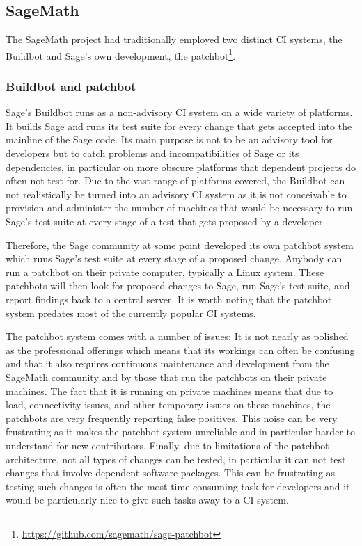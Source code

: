\documentclass{deliverablereport}
\begin{document}
\subsection{SageMath}

The SageMath project had traditionally employed two distinct CI systems, the
Buildbot and Sage's own development, the
patchbot\footnote{\url{https://github.com/sagemath/sage-patchbot}}.

\subsubsection{Buildbot and patchbot}
Sage's Buildbot runs as a non-advisory CI system on a wide variety of
platforms. It builds Sage and runs its test suite for every change that gets
accepted into the mainline of the Sage code. Its main purpose is not to be an
advisory tool for developers but to catch problems and incompatibilities of
Sage or its dependencies, in particular on more obscure platforms that
dependent projects do often not test for. Due to the vast range of platforms
covered, the Buildbot can not realistically be turned into an advisory CI
system as it is not conceivable to provision and administer the number of
machines that would be necessary to run Sage's test suite at every stage of a
test that gets proposed by a developer.

Therefore, the Sage community at some point developed its own patchbot system
which runs Sage's test suite at every stage of a proposed change. Anybody can
run a patchbot on their private computer, typically a Linux system. These
patchbots will then look for proposed changes to Sage, run Sage's test suite,
and report findings back to a central server. It is worth noting that the
patchbot system predates most of the currently popular CI systems.

The patchbot system comes with a number of issues: It is not nearly as polished
as the professional offerings which means that its workings can often be
confusing and that it also requires continuous maintenance and development from
the SageMath community and by those that run the patchbots on their private
machines. The fact that it is running on private machines means that due to
load, connectivity issues, and other temporary issues on these machines, the
patchbots are very frequently reporting false positives. This noise can be very
frustrating as it makes the patchbot system unreliable and in particular harder
to understand for new contributors. Finally, due to limitations of the patchbot
architecture, not all types of changes can be tested, in particular it can not
test changes that involve dependent software packages. This can be frustrating
as testing such changes is often the most time consuming task for developers
and it would be particularly nice to give such tasks away to a CI system.
\end{document}
